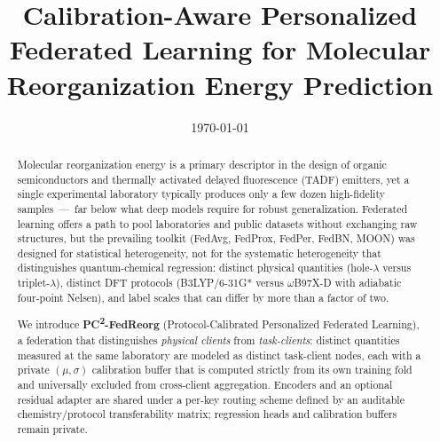 \documentclass[11pt,a4paper]{article}
\title{Calibration-Aware Personalized Federated Learning for Molecular Reorganization Energy Prediction}
\author{\TODO{Author list, affiliations, and corresponding-author email -- to be supplied}}
\date{\today}
\newcommand{\PC}{PC\textsuperscript{2}-FedReorg}
\begin{document}
\maketitle

\begin{abstract}
Molecular reorganization energy is a primary descriptor in the design of organic semiconductors and thermally activated delayed fluorescence (TADF) emitters, yet a single experimental laboratory typically produces only a few dozen high-fidelity samples~---~far below what deep models require for robust generalization. Federated learning offers a path to pool laboratories and public datasets without exchanging raw structures, but the prevailing toolkit (FedAvg, FedProx, FedPer, FedBN, MOON) was designed for statistical heterogeneity, not for the systematic heterogeneity that distinguishes quantum-chemical regression: distinct physical quantities (hole-$\lambda$ versus triplet-$\lambda$), distinct DFT protocols (B3LYP/6-31G* versus $\omega$B97X-D with adiabatic four-point Nelsen), and label scales that can differ by more than a factor of two.

We introduce \textbf{\PC{}} (Protocol-Calibrated Personalized Federated Learning), a federation that distinguishes \emph{physical clients} from \emph{task-clients}: distinct quantities measured at the same laboratory are modeled as distinct task-client nodes, each with a private $(\mu, \sigma)$ calibration buffer that is computed strictly from its own training fold and universally excluded from cross-client aggregation. Encoders and an optional residual adapter are shared under a per-key routing scheme defined by an auditable chemistry/protocol transferability matrix; regression heads and calibration buffers remain private.


\end{abstract}
\end{document}
